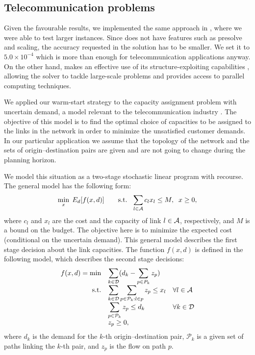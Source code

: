 %
%
\subsection{Telecommunication problems}

Given the favourable results, we implemented the same approach 
in \OOPS \cite{GondzioSarkissian,GondzioGrothey07}, where we were 
able to test larger instances. 
Since \OOPS does not have features such as presolve and scaling,
the accuracy requested in the solution has to be smaller. We set it to
$5.0 \times 10^{-4}$ which is more than enough for telecommunication
applications anyway.
On the other hand, \OOPS makes an effective use of its structure-exploiting
capabilities \cite{GondzioSarkissian,GondzioGrothey07},
allowing the solver to tackle large-scale problems 
and provides access to parallel computing techniques.

We applied our warm-start strategy to the capacity assignment problem 
with uncertain demand, a model relevant to the telecommunication 
industry \cite{Ouorou}. The objective of this model is to find 
the optimal choice of capacities to be assigned to the links 
in the network in order to minimize the unsatisfied customer demands.
In our particular application we assume that the topology 
of the network and the sets of origin--destination pairs are given 
and are not going to change during the planning horizon.

We model this situation as a two-stage stochastic linear program 
with recourse. The general model has the following form:
\[
  \min_x \; E_d [f(x,d)] \qquad 
  \mbox{s.t. }\; \sum_{l \in {\cal A}} c_l x_l \le M, \;\;  x \ge 0,
\]
where $c_l$ and $x_l$ are the cost and the capacity of link $l \in {\cal A}$, 
respectively, and $M$ is a bound on the budget. The objective 
here is to minimize the expected cost (conditional on the uncertain 
demand). This general model describes the first stage 
decision about the link capacities.
The function $f(x,d)$ is defined in the following model, which 
describes the second stage decisions:
\[
\begin{array}{rll}
  f(x,d) =\min & \displaystyle\sum_{k\in {\cal D}} (d_k -\sum_{p\in P_k} z_p)\\
  \mbox{s.t.}  & \displaystyle\sum_{k\in {\cal D}} \sum_{p\in {\cal P}_k: l\in p} z_p \le x_l
                                        & \forall l \in {\cal A} \\
               & \displaystyle\sum_{p\in {\cal P}_k} z_p \le d_k
                                        & \forall k \in {\cal D} \\
               & z_p \ge0,
\end{array}
\]
where $d_k$ is the demand for the $k$-th origin--destination pair, 
$\mathcal{P}_k$ is a given set of paths linking the $k$-th pair, and $z_p$ 
is the flow on path $p$.

